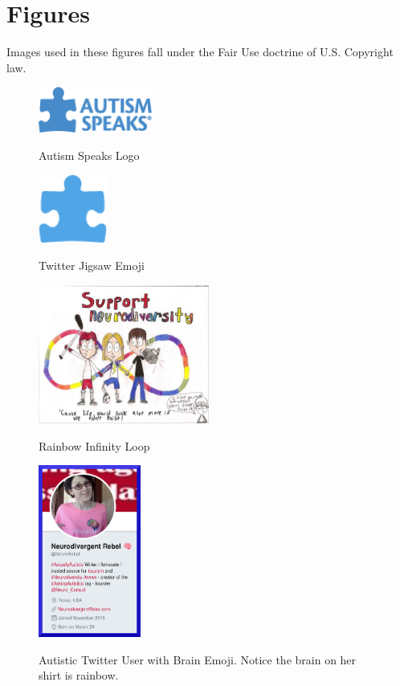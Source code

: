\section{Figures}
\label{apx:figures}

Images used in these figures fall under the Fair Use doctrine of U.S. Copyright law.

\begin{figure}[ht]
\caption{Autism Speaks Logo}
\centering
\includegraphics[width=0.333\textwidth]{aspeaks}
\label{fig:aspeaks}
\end{figure}

\begin{figure}[ht]
\caption{Twitter Jigsaw Emoji}
\centering
\includegraphics[width=0.2\textwidth]{twitterJigsaw}
\label{fig:twitterJigsaw}
\end{figure}

\begin{figure}[ht]
\caption{Rainbow Infinity Loop}
\centering
\includegraphics[width=0.5\textwidth]{infinity.jpg}
\label{fig:infinity}
\end{figure}

\begin{figure}[ht]
\caption[Twitter User with Brain Emoji]{Autistic Twitter User with Brain Emoji. Notice the brain on her shirt is rainbow.}
\centering
\includegraphics[width=0.3\textwidth]{rebel.png}
\label{fig:rebel}
\end{figure}

